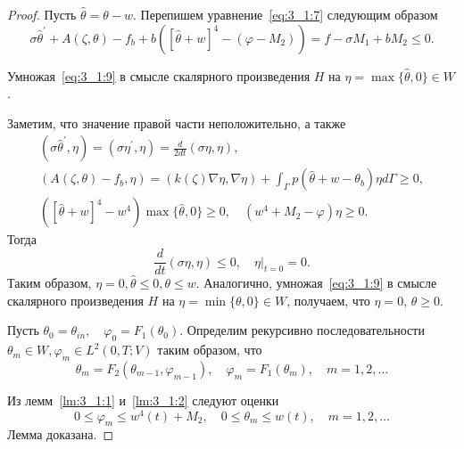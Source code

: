 \begin{proof}
    Пусть $\widehat{\theta}=\theta-w$.
    Перепишем уравнение~\eqref{eq:3_1:7} следующим образом
    \begin{equation}
        \label{eq:3_1:9}
        \sigma \widehat{\theta}^{\prime}+A(\zeta, \theta)-f_{b} +b\left([\widehat{\theta}
        +w]^{4}-\left(\varphi-M_{2}\right)\right)=f-\sigma M_{1}+b M_{2} \leq 0.
    \end{equation}

    Умножая~\eqref{eq:3_1:9} в смысле скалярного
    произведения $H$ на $\eta=\max \{\widehat{\theta}, 0\} \in W$.

    Заметим, что значение правой части неположительно, а также
    \[
        \begin{gathered}
            \left(\sigma \widehat{\theta}^{\prime}, \eta\right)=
            \left(\sigma \eta^{\prime}, \eta\right)=\frac{d}{2 d t}(\sigma \eta, \eta), \\
            \left(A(\zeta, \theta)-f_{b}, \eta\right)=(k(\zeta) \nabla \eta, \nabla \eta)
            + \int_{\Gamma} p\left(\widehat{\theta}+w-\theta_{b}\right) \eta d \Gamma \geq 0, \\
            \left([\widehat{\theta}+w]^{4}-w^{4}\right) \max
            \{\widehat{\theta}, 0\} \geq 0, \quad\left(w^{4}
            + M_{2} - \varphi\right) \eta \geq 0.
        \end{gathered}
    \]
    Тогда
    \[ \frac{d}{d t}(\sigma \eta, \eta) \leq 0,\left.\quad \eta\right|_{t=0}=0. \]
    Таким образом, $\eta=0, \widehat{\theta} \leq 0, \theta \leq w$.
    Аналогично, умножая~\eqref{eq:3_1:9} в смысле скалярного произведения
    $H$ на $\eta=\min \{\theta, 0\} \in W$, получаем, что $\eta=0,\, \theta \geq 0$.

    Пусть $\theta_{0}=\theta_{i n}, \quad \varphi_{0}=F_{1}\left(\theta_{0}\right)$.
    Определим рекурсивно последовательности
    $\theta_{m} \in W, \varphi_{m} \in L^{2}(0, T ; V)$ таким образом, что
    \begin{equation}
        \label{eq:3_1:10}
        \theta_{m}=F_{2}\left(\theta_{m-1}, \varphi_{m-1}\right),
        \quad \varphi_{m}=F_{1}\left(\theta_{m}\right), \quad m=1,2, \ldots
    \end{equation}


    Из лемм~\ref{lm:3_1:1} и~\ref{lm:3_1:2} следуют оценки
    \begin{equation}
        \label{eq:3_1:11}
        0 \leq \varphi_{m} \leq w^{4}(t)+M_{2},
        \quad 0 \leq \theta_{m} \leq w(t), \quad m=1,2, \ldots
    \end{equation}
    Лемма доказана.
\end{proof}
